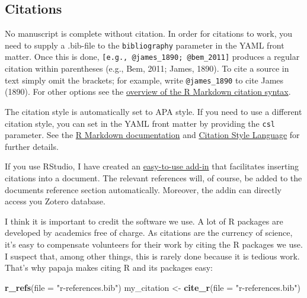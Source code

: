 \documentclass[
  man,floatsintext]{apa6}
\newenvironment{Shaded}{\begin{snugshade}}{\end{snugshade}}
\newcommand{\AttributeTok}[1]{\textcolor[rgb]{0.13,0.29,0.53}{#1}}
\newcommand{\FunctionTok}[1]{\textcolor[rgb]{0.13,0.29,0.53}{\textbf{#1}}}
\newcommand{\NormalTok}[1]{#1}
\newcommand{\OtherTok}[1]{\textcolor[rgb]{0.56,0.35,0.01}{#1}}
\newcommand{\StringTok}[1]{\textcolor[rgb]{0.31,0.60,0.02}{#1}}
\begin{document}
\subsection{Citations}\label{citations}

No manuscript is complete without citation.
In order for citations to work, you need to supply a .bib-file to the \texttt{bibliography} parameter in the YAML front matter.
Once this is done, \texttt{{[}e.g.,\ @james\_1890;\ @bem\_2011{]}} produces a regular citation within parentheses (e.g., Bem, 2011; James, 1890).
To cite a source in text simply omit the brackets; for example, write \texttt{@james\_1890} to cite James (1890).
For other options see the \href{https://rmarkdown.rstudio.com/authoring_bibliographies_and_citations.html}{overview of the R Markdown citation syntax}.

The citation style is automatically set to APA style.
If you need to use a different citation style, you can set in the YAML front matter by providing the \texttt{csl} parameter.
See the \href{https://rmarkdown.rstudio.com/authoring_bibliographies_and_citations.html}{R Markdown documentation} and \href{http://citationstyles.org/}{Citation Style Language} for further details.

If you use RStudio, I have created an \href{https://github.com/crsh/citr}{easy-to-use add-in} that facilitates inserting citations into a document.
The relevant references will, of course, be added to the documents reference section automatically.
Moreover, the addin can directly access you Zotero database.

I think it is important to credit the software we use.
A lot of R packages are developed by academics free of charge.
As citations are the currency of science, it's easy to compensate volunteers for their work by citing the R packages we use.
I suspect that, among other things, this is rarely done because it is tedious work.
That's why papaja makes citing R and its packages easy:

\begin{Shaded}
\begin{Highlighting}[]
\FunctionTok{r\_refs}\NormalTok{(}\AttributeTok{file =} \StringTok{"r{-}references.bib"}\NormalTok{)}
\NormalTok{my\_citation }\OtherTok{\textless{}{-}} \FunctionTok{cite\_r}\NormalTok{(}\AttributeTok{file =} \StringTok{"r{-}references.bib"}\NormalTok{)}
\end{Highlighting}
\end{Shaded}
\end{document}
